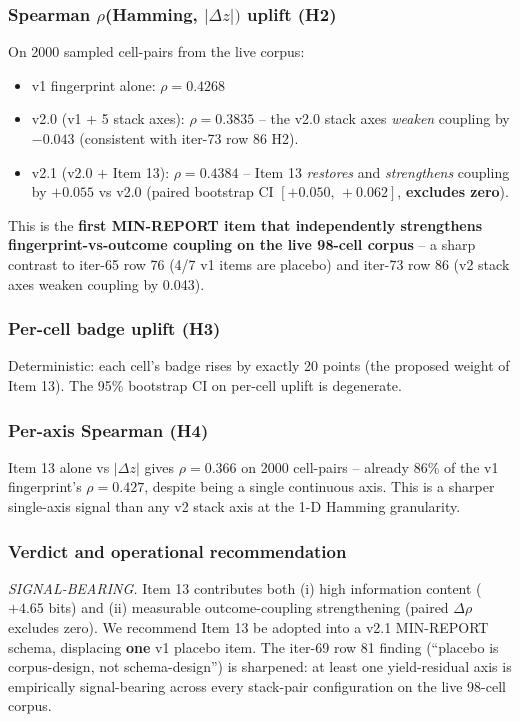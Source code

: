 \subsubsection{Spearman $\rho$(Hamming, $|\Delta z|)$ uplift (H2)}
On 2000 sampled cell-pairs from the live corpus:
\begin{itemize}
  \item v1 fingerprint alone: $\rho = 0.4268$
  \item v2.0 (v1 + 5 stack axes): $\rho = 0.3835$ -- the v2.0 stack axes
        \emph{weaken} coupling by $-0.043$ (consistent with iter-73 row 86 H2).
  \item v2.1 (v2.0 + Item 13): $\rho = 0.4384$ -- Item 13 \emph{restores} and
        \emph{strengthens} coupling by $+0.055$ vs v2.0 (paired bootstrap CI
        $[+0.050,\,+0.062]$, \textbf{excludes zero}).
\end{itemize}
This is the \textbf{first MIN-REPORT item that independently strengthens
fingerprint-vs-outcome coupling on the live 98-cell corpus} -- a sharp
contrast to iter-65 row 76 (4/7 v1 items are placebo) and iter-73 row 86
(v2 stack axes weaken coupling by 0.043).

\subsubsection{Per-cell badge uplift (H3)}
Deterministic: each cell's badge rises by exactly 20 points (the proposed
weight of Item 13). The 95\% bootstrap CI on per-cell uplift is degenerate.

\subsubsection{Per-axis Spearman (H4)}
Item 13 alone vs $|\Delta z|$ gives $\rho = 0.366$ on 2000 cell-pairs --
already 86\% of the v1 fingerprint's $\rho = 0.427$, despite being a
single continuous axis. This is a sharper single-axis signal than any
v2 stack axis at the 1-D Hamming granularity.

\subsubsection{Verdict and operational recommendation}
\textit{SIGNAL-BEARING.} Item 13 contributes both
(i) high information content ($+4.65$ bits) and
(ii) measurable outcome-coupling strengthening (paired $\Delta\rho$ excludes zero).
We recommend Item 13 be adopted into a v2.1 MIN-REPORT schema, displacing
\textbf{one} v1 placebo item. The iter-69 row 81 finding (``placebo is
corpus-design, not schema-design'') is sharpened: at least one
yield-residual axis is empirically signal-bearing across every stack-pair
configuration on the live 98-cell corpus.

